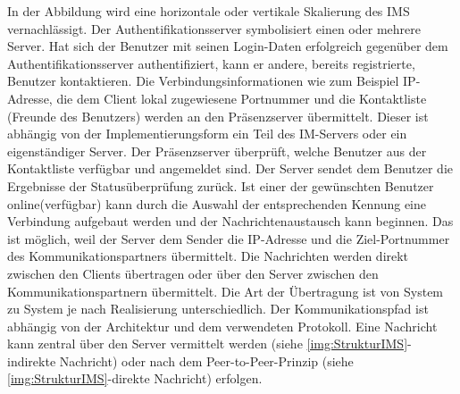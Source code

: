 \documentclass[a4paper,titlepage,halfparskip,12pt]{scrreprt}
\begin{document}
\begin{onehalfspacing}
In der Abbildung wird eine horizontale oder vertikale Skalierung des \ac{IMS} vernachlässigt. Der Authentifikationsserver symbolisiert einen oder mehrere Server. Hat sich der Benutzer mit seinen Login-Daten erfolgreich gegenüber dem Authentifikationsserver authentifiziert, kann er andere, bereits registrierte, Benutzer kontaktieren. Die Verbindungsinformationen wie zum Beispiel IP-Adresse, die dem Client lokal zugewiesene Portnummer und die Kontaktliste (Freunde des Benutzers) werden an den Präsenzserver übermittelt. Dieser ist abhängig von der Implementierungsform ein Teil des IM-Servers oder ein eigenständiger Server. Der Präsenzserver überprüft, welche Benutzer aus der Kontaktliste verfügbar und angemeldet sind. Der Server sendet dem Benutzer die Ergebnisse der Statusüberprüfung zurück. Ist einer der gewünschten Benutzer \glqq online\grqq (verfügbar) kann durch die Auswahl der entsprechenden Kennung eine Verbindung aufgebaut werden und der Nachrichtenaustausch kann beginnen. Das ist möglich, weil der Server dem Sender die IP-Adresse und die Ziel-Portnummer des Kommunikationspartners übermittelt. Die Nachrichten werden direkt zwischen den Clients übertragen oder über den Server zwischen den Kommunikationspartnern übermittelt. Die Art der Übertragung ist von System zu System je nach Realisierung unterschiedlich. Der Kommunikationspfad ist abhängig von der Architektur und dem verwendeten Protokoll. Eine Nachricht kann zentral über den Server vermittelt werden (siehe \autoref{img:StrukturIMS}-indirekte Nachricht) oder nach dem Peer-to-Peer-Prinzip (siehe \autoref{img:StrukturIMS}-direkte Nachricht) erfolgen. 


\end{onehalfspacing}
\end{document}
